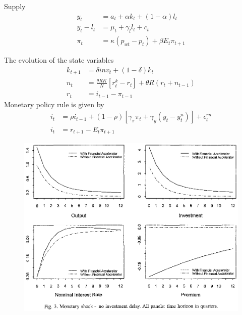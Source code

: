 \documentclass{beamer}
\begin{document}
\begin{frame}
  Supply
\begin{align}
  y_t &= a_t + \alpha k_t + (1-\alpha)l_t\\
  y_t-l_t &= \mu_t + \gamma_l l_t + c_t\\
  \pi_t &= \kappa (p_{wt}-p_t) + \beta E_t \pi_{t+1}
\end{align}
\end{frame}

\begin{frame}
  The evolution of the state variables
\begin{align}
  k_{t+1} &= \delta inv_t + (1-\delta)k_t\\
  n_t &= \frac{\theta RK}{N}[r_ t^k - r_t] + \theta R(r_t+n_{t-1})\\
  r_t &= i_{t-1} - \pi_{t-1}
\end{align}
\medskip
Monetary policy rule is given by
\begin{align}
  i_t &= \rho i_{t-1} + (1-\rho)[\gamma_{\pi}\pi_t + \gamma_y(y_t - y_t^n)]+ \epsilon_t^{rn}\\
  i_t &= r_{t+1} - E_t\pi_{t+1}
\end{align}
\end{frame}

\begin{frame}
 \begin{figure}
   \includegraphics[scale=.8]{bernanke.eps}
 \end{figure}  
\end{frame}
\end{document}
